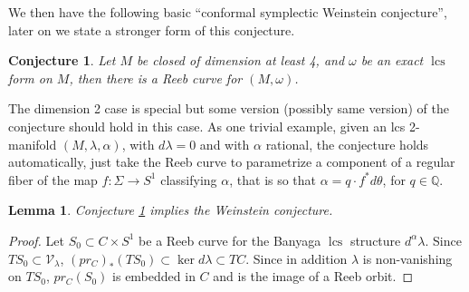 \documentclass{amsart}
\numberwithin{equation}{section}
\newtheorem{lemma}[equation]{Lemma}
\newtheorem{conjecture}{Conjecture}
\theoremstyle{definition}
\theoremstyle{remark}
\DeclareMathOperator{\lcs}{lcs}
\begin{document}
We then have the following basic ``conformal symplectic Weinstein conjecture'', %
later on we state a stronger form of this conjecture.
\begin{conjecture} \label{conjecture:Weinstein} Let $M$ be closed of dimension at least 4, and $\omega$ be an exact $\lcs$ form on $M$, then there is a Reeb curve for $(M, \omega)$. 
\end{conjecture}
The dimension 2 case is special but some version (possibly same version) of the conjecture should hold in this case. As one trivial example, given an lcs 2-manifold $(M, \lambda, \alpha)$, with $d\lambda=0$ and with $\alpha$ rational, the conjecture holds automatically, just take the Reeb curve to parametrize a component of a regular fiber of the map $f: \Sigma \to S ^{1} $ classifying $\alpha$, that is so that $\alpha = q \cdot f ^{*} d\theta  $, for $q \in \mathbb{Q}$.
%
\begin{lemma} \label{thm:implies}
Conjecture \ref{conjecture:Weinstein} implies the Weinstein conjecture.   
\end{lemma}
\begin{proof} 
   Let $S _{0} \subset  C \times S ^{1} $ be a Reeb curve for the Banyaga $\lcs$ structure $d ^{\alpha} \lambda $.
   Since $T S _{0}  \subset \mathcal{V} _{\lambda} $, $(pr _{C})_* (TS _{0})  \subset \ker d\lambda \subset TC $. 
Since in addition $\lambda$ is non-vanishing on $TS _{0}$, $pr _{C} (S _{0} ) $  is embedded in $C$ and is the image of a Reeb orbit. 
\end{proof}
\end{document}
